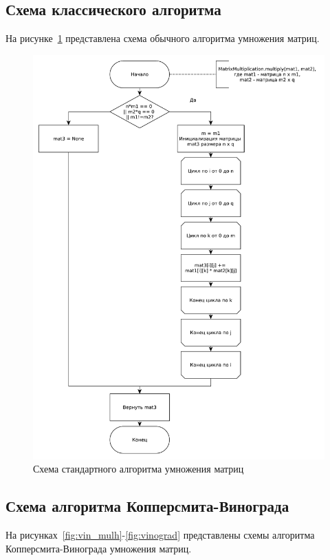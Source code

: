 \documentclass[12pt]{report}
\begin{document}
    \subsection{Схема классического алгоритма}
    На рисунке~\ref{fig:matmult} представлена схема обычного алгоритма умножения матриц.

    \begin{figure}[H]
        \centering
        \includegraphics[width=0.85\linewidth]{img/MatrixMultiplication}
        \caption{
                Схема стандартного алгоритма умножения матриц
            }
        \label{fig:matmult}
    \end{figure}

    \subsection{Схема алгоритма Копперсмита-Винограда}
    На рисунках~\ref{fig:vin_mulh}-\ref{fig:vinograd} представлены схемы алгоритма Копперсмита-Винограда
    умножения матриц.
\end{document}
